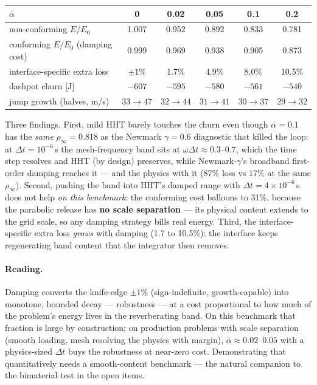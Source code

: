 \documentclass[11pt]{article}
\begin{document}
\begin{center}
\small
\begin{tabular}{lccccc}
\toprule
$\bar\alpha$ & 0 & 0.02 & 0.05 & 0.1 & 0.2 \\
\midrule
non-conforming $E/E_0$ & 1.007 & 0.952 & 0.892 & 0.833 & 0.781 \\
conforming $E/E_0$ (damping cost) & 0.999 & 0.969 & 0.938 & 0.905 & 0.873 \\
interface-specific extra loss & $\pm 1$\% & 1.7\% & 4.9\% & 8.0\% & 10.5\% \\
dashpot churn [J] & $-607$ & $-595$ & $-580$ & $-561$ & $-540$ \\
jump growth (halves, m/s) & $33\to47$ & $32\to44$ & $31\to41$ & $30\to37$ & $29\to32$ \\
\bottomrule
\end{tabular}
\end{center}

Three findings.  First, mild HHT barely touches the churn even though
$\bar\alpha = 0.1$ has the \emph{same} $\rho_\infty = 0.818$ as the
Newmark $\gamma = 0.6$ diagnostic that killed the loop: at $\Delta t =
10^{-6}$\,s the mesh-frequency band sits at $\omega\Delta t \approx
0.3$--$0.7$, which the time step resolves and HHT (by design)
preserves, while Newmark-$\gamma$'s broadband first-order damping
reaches it --- and the physics with it (87\% loss vs 17\% at the same
$\rho_\infty$).  Second, pushing the band into HHT's damped range with
$\Delta t = 4\times10^{-6}$\,s does not help \emph{on this
benchmark}: the conforming cost balloons to 31\%, because the
parabolic release has \textbf{no scale separation} --- its physical
content extends to the grid scale, so any damping strategy bills real
energy.  Third, the interface-specific extra loss \emph{grows} with
damping (1.7 to 10.5\%): the interface keeps regenerating band content
that the integrator then removes.

\paragraph{Reading.}  Damping converts the knife-edge $\pm 1$\%
(sign-indefinite, growth-capable) into monotone, bounded decay ---
robustness --- at a cost proportional to how much of the problem's
energy lives in the reverberating band.  On this benchmark that
fraction is large by construction; on production problems with scale
separation (smooth loading, mesh resolving the physics with margin),
$\bar\alpha \approx 0.02$--$0.05$ with a physics-sized $\Delta t$
buys the robustness at near-zero cost.  Demonstrating that
quantitatively needs a smooth-content benchmark --- the natural
companion to the bimaterial test in the open items.
\end{document}
